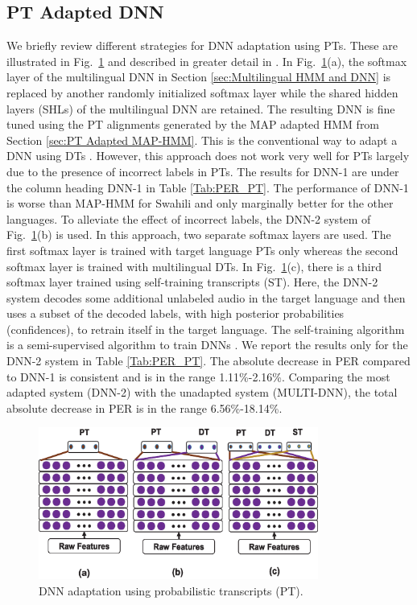 \documentclass[a4paper]{article}
\newcommand{\myvspacefig}{\vspace{-4mm}}
\begin{document}
\subsection{PT Adapted DNN} \vspace{-1mm}
\label{sec:PT Adapted DNN}
We briefly review different strategies for DNN adaptation using PTs. These are illustrated in Fig.~\ref{fig:DNN} and described in greater detail in \cite{Das-PTAdaptedDNN}. In Fig.~\ref{fig:DNN}(a), the softmax layer of the multilingual DNN in Section \ref{sec:Multilingual HMM and DNN} is replaced by another randomly initialized softmax layer while the shared hidden layers (SHLs) of the multilingual DNN are retained. The resulting DNN is fine tuned using the PT alignments generated by the MAP adapted HMM from Section \ref{sec:PT Adapted MAP-HMM}. This is the conventional way to adapt a DNN using DTs \cite{Ghoshal-MultilingualPretraining}. However, this approach does not work very well for PTs largely due to the presence of incorrect labels in PTs. The results for DNN-1 are under the column heading DNN-1 in Table \ref{Tab:PER_PT}. The performance of DNN-1 is worse than MAP-HMM for Swahili and only marginally better for the other languages. To alleviate the effect of incorrect labels, the DNN-2 system of Fig.~\ref{fig:DNN}(b) is used. In this approach, two separate softmax layers are used. The first softmax layer is trained with target language PTs only whereas the second softmax layer is trained with multilingual DTs. In Fig.~\ref{fig:DNN}(c), there is a third softmax layer trained using self-training transcripts (ST). Here, the DNN-2 system decodes some additional unlabeled audio in the target language and then uses a subset of the decoded labels, with high posterior probabilities (confidences), to retrain itself in the target language. The self-training algorithm is a semi-supervised algorithm to train DNNs \cite{Vesely-SemisupTrainingDNN}. We report the results only for the DNN-2 system in Table \ref{Tab:PER_PT}. The absolute decrease in PER compared to DNN-1 is consistent and is in the range 1.11\%-2.16\%. Comparing the most adapted system (DNN-2) with the unadapted system (MULTI-DNN), the total absolute decrease in PER is in the range 6.56\%-18.14\%.

\begin{figure}
 \centering
 \includegraphics[width=\linewidth,height=5cm]{fig/DNN_multisoftmax.eps} 
 \myvspacefig
 \myvspacefig
  \caption{DNN adaptation using probabilistic transcripts (PT).} 
 \label{fig:DNN}
\end{figure}
\end{document}
